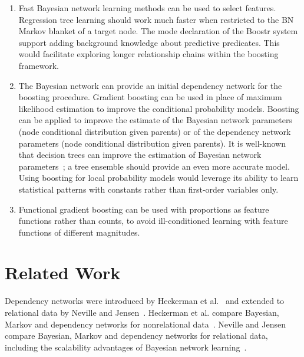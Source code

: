 \documentclass[runningheads,a4paper]{llncs}
\begin{document}
\begin{enumerate}
\item Fast Bayesian network learning methods can be used to select features. Regression tree learning should work much faster when restricted to the BN Markov blanket of a target node. The mode declaration of the Boostr system support adding background knowledge about predictive predicates. This would facilitate exploring longer relationship chains within the boosting framework.
\item The Bayesian network can provide an initial dependency network for the boosting procedure. Gradient boosting can be used in place of maximum likelihood estimation to improve the conditional probability models. Boosting can be applied to improve the estimate of the Bayesian network parameters (node conditional distribution given parents) or of the dependency network parameters (node conditional distribution given parents). It is well-known that decision trees can improve the estimation of Bayesian network parameters~\cite{Friedman1998}; a tree ensemble should provide an even more accurate model. Using boosting for local probability models would leverage its ability to learn statistical patterns with constants rather than first-order variables only.
\item Functional gradient boosting can be used with proportions as feature functions rather than counts, to avoid ill-conditioned learning with feature functions of different magnitudes.  
\end{enumerate}


\section{Related Work}
Dependency networks were introduced by Heckerman et al.~\cite{Heckerman2000} and extended to relational data by Neville and Jensen~\cite{Neville2007}. 
Heckerman et al. compare Bayesian, Markov and dependency networks for nonrelational data~\cite{Heckerman2000}. Neville and Jensen compare Bayesian, Markov and dependency networks for relational data, including the scalability advantages of Bayesian network learning~\cite[Sec.8.5.1]{Neville2007}.
\end{document}
